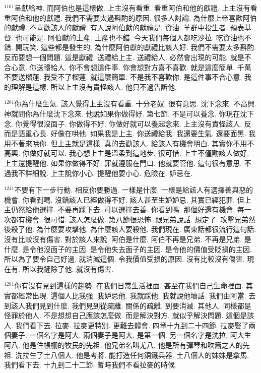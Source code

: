 \documentclass{book}
\begin{document}
$^{1161}$呈獻給神.
而阿伯也是這樣做.
上主沒有看重.
看重阿伯和他的獻禮.
上主沒有看重阿伯和他的獻禮.
我們不需要太過斟酌的原因.
很多人討論.
為什麼上帝喜歡阿伯的獻禮.
不喜歡該人的獻禮.
有人說阿伯獻的獻禮是.
資油.
羊群中投生者.
預表基督.
也可能是.
阿伯獻的土產.
土產也不錯.
今天我們每個人都吃沙拉.
吃資油也不錯.
開玩笑.
這些都是發生的.
為什麼阿伯獻的獻禮比該人好.
我們不需要太多斟酌.
反而要想一個問題.
這是獻禮.
送禮給上主.
送禮給人.
必然會出現的可能.
就是不合心意.
你送禮給人.
你不會想這件事.
你會想對方喜不喜歡.
就是這麼簡單.
千萬不要送榴蓮.
我受不了榴蓮.
就這麼簡單.
不是我不喜歡你.
是這件事不合心意.
我的理解是這樣.
所以上主沒有責怪該人.
他只不過告訴他.

$^{1201}$你為什麼生氣.
該人覺得上主沒有看重.
十分老奴.
很有意思.
沈下念來.
不高興.
神就問你為什麼沈下念來.
他說如果你做得好.
第七節.
不是可以養念.
你現在沈下念.
你覺得很沒面子.
你做得不好.
你做好就可以養起念來.
上主沒有責怪該人.
反而是語重心長.
好像在哄他.
如果我是上主.
你送禮給我.
我還要生氣.
還要面黑.
我用不著來哄你.
但上主就是這樣.
真的去勸該人.
給該人有機會明白.
其實你不用不高興.
你做好就可以.
我心想上主是溫柔到這地步.
很可惜.
上主不僅勸該人做好.
上主還提醒他.
如果你做得不好.
罪就遵服在門口.
他就要管他.
這句很有意思.
不過我不詳細說.
上主說你小心.
提醒他要小心.
危險在.
妒忌在.

$^{1241}$不要有下一步行動.
相反你要勝過.
一樣是什麼.
一樣是給該人有選擇善與惡的機會.
你看到嗎.
沒錯該人已經做得不好.
該人甚至生妒妒忌.
其實已經犯罪.
但上主仍然給他選擇.
不要再踩下去.
可以選擇去善.
你看到嗎.
那個好還有機會.
每一次都有機會.
很可惜.
該人怎麼做.
第八節很恐怖.
跟兄弟說話.
想定了.
攻擊兄弟然後殺了他.
為什麼要攻擊他.
為什麼該人要殺他.
我們現在.
廣東話都很流行這句話.
沒有比較沒有傷害.
對於該人來說.
阿伯是什麼.
阿伯不再是兄弟.
不再是兄弟.
是什麼.
是令他沒面子的主因.
是令他失去面子的主因.
是令他的價值受貶損的主因.
所以為了要令自己好過.
就消滅這個.
令我價值受損的原因.
沒有比較沒有傷害.
現在有.
所以我鏟除了他.
就沒有傷害.

$^{1281}$你有沒有見到這樣的趨勢.
在我們日常生活裡面.
甚至在我們自己生命裡面.
其實都經常出現.
這個人比我強.
我妒忌他.
我就踩他.
我就說他壞話.
我們由阿當.
去到該人我們見到什麼.
我們見到從疏離.
關係的疏離.
到要消滅.
其他人.
同樣都是怪罪於他人.
不是想想自己應該怎麼做.
而是解決對方.
就似乎解決問題.
這個是該人.
我們看下去.
拉麥.
拉麥更特別.
更難去體會.
四章十九到二十四節.
拉麥娶了兩個妻子.
一個名字是阿大.
兩個妻子是阿大.
是第一個.
另一個名字是洗拉.
阿大生阿八.
他是住帳棚的牧民的先祖.
他兄弟名叫尤八.
他是所有彈琴和吹簫之人的先祖.
洗拉生了土八個人.
他是考將.
能打造任何銅鐵兵器.
土八個人的妹妹是拿馬.
我們看下去.
十九到二十二節.
暫時我們不看拉麥的時候.
\end{document}
